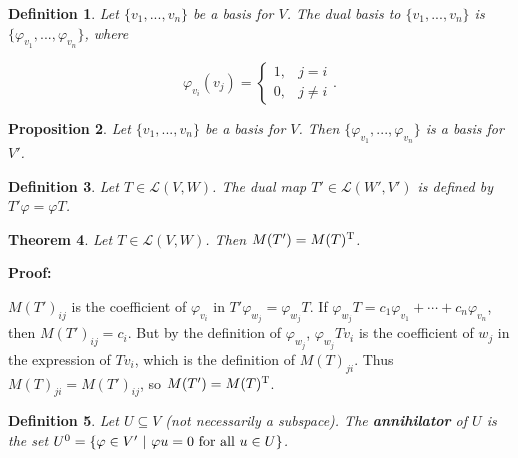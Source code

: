 \documentclass{article}
\theoremstyle{colontheorem}
\newtheorem{theorem}{Theorem}[section]
\newtheorem{proposition}[theorem]{Proposition}
\newtheorem{definition}[theorem]{Definition}
\newenvironment{Theorem}
{
	\begin{mdframed}[backgroundcolor=TheoremOrange!10]
	\begin{theorem}
}
{
	\end{theorem}
	\end{mdframed}
	
	\vspace{.15in}
}
\newenvironment{Proposition}
{
	\begin{mdframed}[backgroundcolor=TheoremOrange!10]
	\begin{proposition}
}
{
	\end{proposition}
	\end{mdframed}
	
	\vspace{.15in}
}
\newenvironment{Def}
{
	\begin{mdframed}[backgroundcolor=DefGreen!10]
	\begin{definition}
}
{
	\end{definition}
	\end{mdframed}
	
	\vspace{.15in}
}
\newenvironment{Proof}
{
	\vspace{-.3in}
	
	\begin{mdframed}[backgroundcolor=ProofPurple!10]
	\textbf{Proof:}%
}
{
	\end{mdframed}
	
	\vspace{.15in}
}
\begin{document}
\begin{Def}
	
	Let $\{v_1, ..., v_n\}$ be a basis for $V$. The dual basis to $\{v_1, ..., v_n\}$ is $\{\varphi_{v_1}, ..., \varphi_{v_n}\}$, where
	
	$$
		\varphi_{v_i}(v_j) = \begin{cases} 
		1, & j = i \\
		0, & j \neq i
		\end{cases}.
	$$
	
\end{Def}



\begin{Proposition}
	
	Let $\{v_1, ..., v_n\}$ be a basis for $V$. Then $\{\varphi_{v_1}, ..., \varphi_{v_n}\}$ is a basis for $V'$.
	
\end{Proposition}



\begin{Def}
	
	Let $T \in \mathcal{L}(V,W)$. The dual map $T' \in \mathcal{L}(W',V')$ is defined by $T'\varphi = \varphi T$.
	
\end{Def}



\begin{Theorem}
	
	Let $T \in \mathcal{L}(V,W)$. Then $M(T') = M(T)^\textnormal{T}$.
	
\end{Theorem}



\begin{Proof}
	$M(T')_{ij}$ is the coefficient of $\varphi_{v_i}$ in $T'\varphi_{w_j} = \varphi_{w_j} T$. If $\varphi_{w_j} T = c_1 \varphi_{v_1} + \cdots + c_n \varphi_{v_n}$, then $M(T')_{ij} = c_i$. But by the definition of $\varphi_{w_j}$, $\varphi_{w_j} Tv_i$ is the coefficient of $w_j$ in the expression of $Tv_i$, which is the definition of $M(T)_{ji}$. Thus $M(T)_{ji} = M(T')_{ij}$, so $M(T') = M(T)^\textnormal{T}$.
	
\end{Proof}



\begin{Def}
	
	Let $U \subseteq V$ (not necessarily a subspace). The \textbf{annihilator} of $U$ is the set $U^0 = \{\varphi \in V'\ |\ \varphi u = 0\ \textnormal{for all}\ u \in U\}$.
	
\end{Def}
\end{document}
